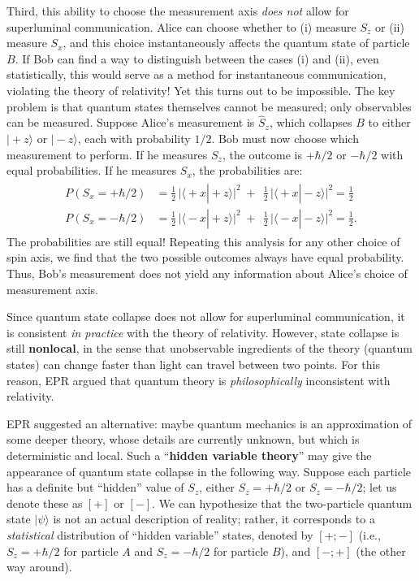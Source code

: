 \documentclass[pra,12pt]{revtex4}
\begin{document}
Third, this ability to choose the measurement axis \textit{does not}
allow for superluminal communication.  Alice can choose whether to (i)
measure $S_z$ or (ii) measure $S_x$, and this choice instantaneously
affects the quantum state of particle $B$.  If Bob can find a way to
distinguish between the cases (i) and (ii), even statistically, this
would serve as a method for instantaneous communication, violating the
theory of relativity!  Yet this turns out to be impossible.  The key
problem is that quantum states themselves cannot be measured; only
observables can be measured.  Suppose Alice's measurement is
$\hat{S}_z$, which collapses $B$ to either $|\!+\!z\rangle$ or
$|\!-\!z\rangle$, each with probability $1/2$.  Bob must now choose
which measurement to perform.  If he measures $S_z$, the outcome is
$+\hbar/2$ or $-\hbar/2$ with equal probabilities.  If he measures
$S_x$, the probabilities are:
\begin{align}
  \begin{aligned}P(S_x = +\hbar/2) &= \frac{1}{2}\, \Big|\langle\!+x|\!+\!z\rangle\Big|^2 \;+\;\, \frac{1}{2}\, \Big|\langle\!+x|\!-\!z\rangle\Big|^2 = \frac{1}{2}\\P(S_x = -\hbar/2) &= \frac{1}{2}\, \Big|\langle\!-x|\!+\!z\rangle\Big|^2 \;+\;\, \frac{1}{2}\, \Big|\langle\!-x|\!-\!z\rangle\Big|^2 = \frac{1}{2}.\end{aligned}
\end{align}
The probabilities are still equal!  Repeating this analysis for any
other choice of spin axis, we find that the two possible outcomes
always have equal probability.  Thus, Bob's measurement does not yield
any information about Alice's choice of measurement axis.

Since quantum state collapse does not allow for superluminal
communication, it is consistent \textit{in practice} with the theory
of relativity.  However, state collapse is still \textbf{nonlocal}, in
the sense that unobservable ingredients of the theory (quantum states)
can change faster than light can travel between two points.  For this
reason, EPR argued that quantum theory is \textit{philosophically}
inconsistent with relativity.

EPR suggested an alternative: maybe quantum mechanics is an
approximation of some deeper theory, whose details are currently
unknown, but which is deterministic and local.  Such a
``\textbf{hidden variable theory}'' may give the appearance of
quantum state collapse in the following way.  Suppose each particle
has a definite but ``hidden'' value of $S_z$, either $S_z = +\hbar/2$
or $S_z = -\hbar/2$; let us denote these as $[+]$ or $[-]$.  We can
hypothesize that the two-particle quantum state $|\psi\rangle$ is not
an actual description of reality; rather, it corresponds to a
\textit{statistical} distribution of ``hidden variable'' states,
denoted by $[+;-]$ (i.e., $S_z = +\hbar/2$ for particle $A$ and $S_z =
-\hbar/2$ for particle $B$), and $[-;+]$ (the other way around).
\end{document}
